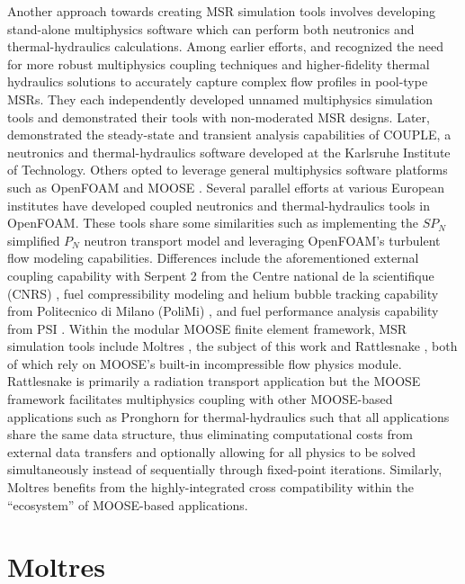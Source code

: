 Another approach towards creating \gls{MSR} simulation tools involves
developing stand-alone multiphysics software which can perform both
neutronics and thermal-hydraulics calculations. Among earlier efforts,
\cite{nicolino_coupled_2008} and \cite{zhang_development_2009} recognized the
need for more robust multiphysics coupling techniques and higher-fidelity
thermal hydraulics solutions to accurately capture complex flow profiles in
pool-type \glspl{MSR}. They each independently developed unnamed multiphysics
simulation tools and demonstrated their tools with non-moderated \gls{MSR}
designs. Later, \cite{li_transient_2015} demonstrated the steady-state and
transient analysis capabilities of COUPLE, a neutronics and thermal-hydraulics
software developed at the Karlsruhe Institute of Technology.  Others opted to
leverage general multiphysics software platforms such as OpenFOAM
\citep{openfoam_openfoam_2021} and \gls{MOOSE}
\citep{gaston_physics-based_2015}.
Several parallel efforts at various European institutes have developed coupled
neutronics and thermal-hydraulics tools in OpenFOAM. These tools share some
similarities such as implementing the $SP_N$ simplified $P_N$ neutron transport
model and leveraging OpenFOAM's turbulent flow modeling capabilities.
Differences include the aforementioned external coupling capability with
Serpent 2 from the Centre national de la scientifique (CNRS)
\citep{blanco_neutronic_2020}, fuel compressibility modeling and helium bubble
tracking capability from Politecnico di Milano (PoliMi)
\citep{cervi_development_2019}, and fuel performance analysis capability from
PSI \citep{fiorina_creation_2018}. Within the modular MOOSE finite element
framework, \gls{MSR} simulation tools include Moltres
\citep{lindsay_introduction_2018}, the subject of this work and Rattlesnake
\citep{wang_rattlesnake_2021}, both of which rely on MOOSE's built-in
incompressible flow physics module. Rattlesnake is primarily a radiation
transport application but the MOOSE framework facilitates multiphysics coupling
with other MOOSE-based applications such as Pronghorn for thermal-hydraulics
such that all applications share the same data structure, thus eliminating
computational costs from external data transfers and optionally allowing for
all physics to be solved simultaneously instead of sequentially through
fixed-point iterations. Similarly, Moltres benefits from the highly-integrated
cross compatibility within the ``ecosystem'' of MOOSE-based applications.

\section{Moltres}

